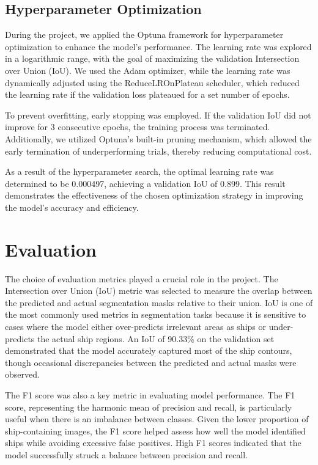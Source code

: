 \documentclass{article}
\begin{document}
\subsection{Hyperparameter Optimization}

During the project, we applied the Optuna framework for hyperparameter optimization to enhance the model's performance. The learning rate was explored in a logarithmic range, with the goal of maximizing the validation Intersection over Union (IoU). We used the Adam optimizer, while the learning rate was dynamically adjusted using the ReduceLROnPlateau scheduler, which reduced the learning rate if the validation loss plateaued for a set number of epochs.

To prevent overfitting, early stopping was employed. If the validation IoU did not improve for 3 consecutive epochs, the training process was terminated. Additionally, we utilized Optuna's built-in pruning mechanism, which allowed the early termination of underperforming trials, thereby reducing computational cost.

As a result of the hyperparameter search, the optimal learning rate was determined to be 0.000497, achieving a validation IoU of 0.899. This result demonstrates the effectiveness of the chosen optimization strategy in improving the model's accuracy and efficiency.


\section{Evaluation}

The choice of evaluation metrics played a crucial role in the project. The Intersection over Union (IoU) metric was selected to measure the overlap between the predicted and actual segmentation masks relative to their union. IoU is one of the most commonly used metrics in segmentation tasks because it is sensitive to cases where the model either over-predicts irrelevant areas as ships or under-predicts the actual ship regions. An IoU of 90.33\% on the validation set demonstrated that the model accurately captured most of the ship contours, though occasional discrepancies between the predicted and actual masks were observed.

The F1 score was also a key metric in evaluating model performance. The F1 score, representing the harmonic mean of precision and recall, is particularly useful when there is an imbalance between classes. Given the lower proportion of ship-containing images, the F1 score helped assess how well the model identified ships while avoiding excessive false positives. High F1 scores indicated that the model successfully struck a balance between precision and recall.
\end{document}
